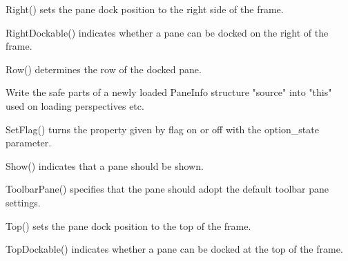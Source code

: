 Right() sets the pane dock position to the right side of the frame.

\label{wxauipaneinforightdockable}


RightDockable() indicates whether a pane can be docked on the right of the frame.

\label{wxauipaneinforow}


Row() determines the row of the docked pane.

\label{wxauipaneinfosafeset}


Write the safe parts of a newly loaded PaneInfo structure "source" into "this"
used on loading perspectives etc.

\label{wxauipaneinfosetflag}


SetFlag() turns the property given by flag on or off with the option_state parameter.

\label{wxauipaneinfoshow}


Show() indicates that a pane should be shown.

\label{wxauipaneinfotoolbarpane}


ToolbarPane() specifies that the pane should adopt the default toolbar pane settings.

\label{wxauipaneinfotop}


Top() sets the pane dock position to the top of the frame.

\label{wxauipaneinfotopdockable}


TopDockable() indicates whether a pane can be docked at the top of the frame.

